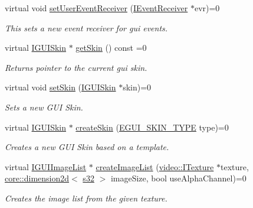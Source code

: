\begin{DoxyCompactItemize}
virtual void \hyperlink{classirr_1_1gui_1_1IGUIEnvironment_a2491715aa30894c66357eb0451aa10b0}{set\+User\+Event\+Receiver} (\hyperlink{classirr_1_1IEventReceiver}{I\+Event\+Receiver} $\ast$evr)=0
\begin{DoxyCompactList}\small\item\em This sets a new event receiver for gui events. \end{DoxyCompactList}\item 
virtual \hyperlink{classirr_1_1gui_1_1IGUISkin}{I\+G\+U\+I\+Skin} $\ast$ \hyperlink{classirr_1_1gui_1_1IGUIEnvironment_a54ce9072ea7b89cdaea65306e93ba90c}{get\+Skin} () const =0
\begin{DoxyCompactList}\small\item\em Returns pointer to the current gui skin. \end{DoxyCompactList}\item 
virtual void \hyperlink{classirr_1_1gui_1_1IGUIEnvironment_ae7042c520e848643e080ad4532797f23}{set\+Skin} (\hyperlink{classirr_1_1gui_1_1IGUISkin}{I\+G\+U\+I\+Skin} $\ast$skin)=0
\begin{DoxyCompactList}\small\item\em Sets a new G\+UI Skin. \end{DoxyCompactList}\item 
virtual \hyperlink{classirr_1_1gui_1_1IGUISkin}{I\+G\+U\+I\+Skin} $\ast$ \hyperlink{classirr_1_1gui_1_1IGUIEnvironment_a824099cd1ba9dd4b95e40dd1b15244f1}{create\+Skin} (\hyperlink{namespaceirr_1_1gui_a7b4619db540cbdf96e81023893b4eca5}{E\+G\+U\+I\+\_\+\+S\+K\+I\+N\+\_\+\+T\+Y\+PE} type)=0
\begin{DoxyCompactList}\small\item\em Creates a new G\+UI Skin based on a template. \end{DoxyCompactList}\item 
virtual \hyperlink{classirr_1_1gui_1_1IGUIImageList}{I\+G\+U\+I\+Image\+List} $\ast$ \hyperlink{classirr_1_1gui_1_1IGUIEnvironment_af3bd793f81b15dc534648e8a37e76467}{create\+Image\+List} (\hyperlink{classirr_1_1video_1_1ITexture}{video\+::\+I\+Texture} $\ast$texture, \hyperlink{classirr_1_1core_1_1dimension2d}{core\+::dimension2d}$<$ \hyperlink{namespaceirr_ac66849b7a6ed16e30ebede579f9b47c6}{s32} $>$ image\+Size, bool use\+Alpha\+Channel)=0
\begin{DoxyCompactList}\small\item\em Creates the image list from the given texture. \end{DoxyCompactList}\item 

\end{DoxyCompactItemize}
